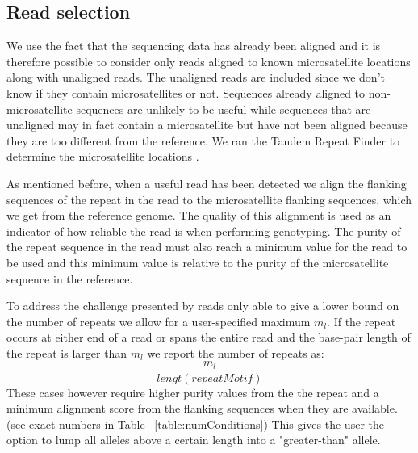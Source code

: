 \documentclass{bioinfo}
\begin{document}
\subsection{Read selection}
    We use the fact that the sequencing data has already been aligned and it is therefore possible to consider only reads aligned to known microsatellite locations along with unaligned reads. The unaligned reads are included since we don't know if they contain microsatellites or not. Sequences already aligned to non-microsatellite sequences are unlikely to be useful while sequences that are unaligned may in fact contain a microsatellite but have not been aligned because they are too different from the reference. We ran the Tandem Repeat Finder to determine the microsatellite locations \cite{TRF}.
    
    As mentioned before, when a useful read has been detected we align the flanking sequences of the repeat in the read to the microsatellite flanking sequences, which we get from the reference genome. The quality of this alignment is used as an indicator of how reliable the read is when performing genotyping. The purity of the repeat sequence in the read must also reach a minimum value for the read to be used and this minimum value is relative to the purity of the microsatellite sequence in the reference.
    
    To address the challenge presented by reads only able to give a lower bound on the number of repeats we allow for a user-specified maximum $m_l$. If the repeat occurs at either end of a read or spans the entire read and the base-pair length of the repeat is larger than $m_l$ we report the number of repeats as:
    \begin{equation}
        \frac{m_l}{lengt(repeatMotif)}
    \end{equation}
    These cases however require higher purity values from the the repeat and a minimum alignment score from the flanking sequences when they are available.(see exact numbers in Table ~\ref{table:numConditions}) 
    This gives the user the option to lump all alleles above a certain length into a "greater-than" allele.
    
\end{document}

